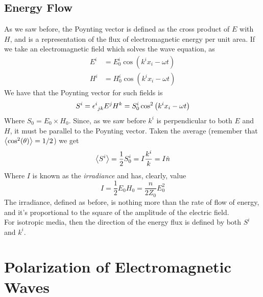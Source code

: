 \documentclass[../electromagnetism.tex]{subfiles}
\begin{document}
\subsection{Energy Flow}
As we saw before, the Poynting vector is defined as the cross product of $E$ with $H$, and is a representation of the flux of electromagnetic energy per unit area. If we take an electromagnetic field which solves the wave equation, as 
\begin{equation}
	\begin{aligned}
		E^i&= E_0^i\cos\left( k^ix_i-\omega t \right)\\
		H^i&= H_0^i\cos\left( k^ix_i-\omega t \right)
	\end{aligned}
	\label{eq:planewaveem}
\end{equation}
We have that the Poynting vector for such fields is
\begin{equation*}
	S^i=\epsilon^{i}_{\ jk}E^jH^k=S^i_0\cos^2\left( k^ix_i-\omega t \right)
\end{equation*}
Where $S_0=E_0\times H_0$. Since, as we saw before $k^i$ is perpendicular to both $E$ and $H$, it must be parallel to the Poynting vector. Taken the average (remember that $\expval{\cos^2(\theta)}=1/2$) we get
\begin{equation}
	\expval{S^i}=\frac{1}{2}S^i_0=I\frac{k^i}{k}=I\hat{n}
	\label{eq:poyntingvec}
\end{equation}
Where $I$ is known as the \textit{irradiance} and has, clearly, value
\begin{equation*}
	I=\frac{1}{2}E_0H_0=\frac{n}{2Z_0}E_0^2
\end{equation*}
The irradiance, defined as before, is nothing more than the rate of flow of energy, and it's proportional to the square of the amplitude of the electric field.\\
For isotropic media, then the direction of the energy flux is defined by both $S^i$ and $k^i$.
\section{Polarization of Electromagnetic Waves}
\end{document}
